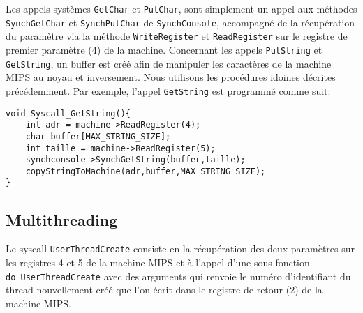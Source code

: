 \documentclass{report}
\begin{document}
Les appels systèmes \texttt{GetChar} et \texttt{PutChar}, sont simplement un appel aux méthodes \texttt{SynchGetChar} et \texttt{SynchPutChar} de \texttt{SynchConsole}, accompagné de la récupération du paramètre via la méthode \texttt{WriteRegister} et \texttt{ReadRegister} sur le registre de premier paramètre (4) de la machine. Concernant les appels \texttt{PutString} et \texttt{GetString}, un buffer est créé afin de manipuler les caractères de la machine MIPS au noyau et inversement. Nous utilisons les procédures idoines décrites précédemment. Par exemple, l'appel \texttt{GetString} est programmé comme suit:
\begin{verbatim}
void Syscall_GetString(){
    int adr = machine->ReadRegister(4); 
    char buffer[MAX_STRING_SIZE];
    int taille = machine->ReadRegister(5);
    synchconsole->SynchGetString(buffer,taille);
    copyStringToMachine(adr,buffer,MAX_STRING_SIZE); 
}
\end{verbatim}

\subsection*{Multithreading}
Le syscall \texttt{UserThreadCreate} consiste en la récupération des deux paramètres sur les registres 4 et 5 de la machine MIPS et à l'appel d'une sous fonction \texttt{do\_UserThreadCreate} avec des arguments qui renvoie le numéro d'identifiant du thread nouvellement créé que l'on écrit dans le registre de retour (2) de la machine MIPS.\\
\end{document}
